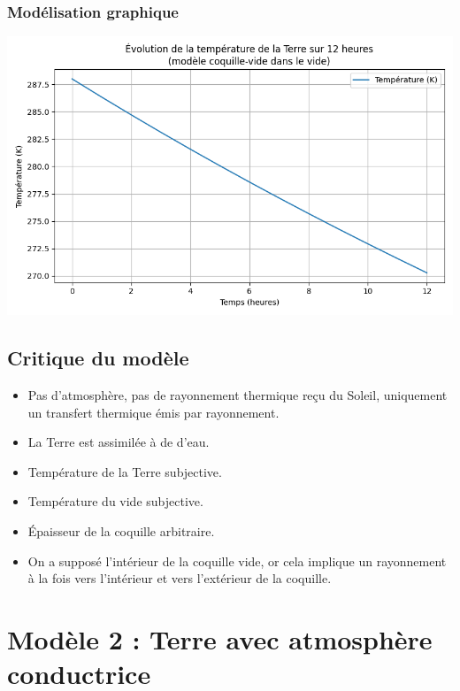 \documentclass[a4paper,12pt]{article}
\begin{document}
\subsubsection*{Modélisation graphique}   
\begin{center}
  \includegraphics[width=0.8\linewidth]{../modele1/figures/modele1_coquille.png} 
\end{center}



\subsection{Critique du modèle}

\begin{itemize}
    \item Pas d’atmosphère, pas de rayonnement thermique reçu du Soleil, uniquement un transfert thermique émis par rayonnement.
    \item La Terre est assimilée à de d’eau.
    \item Température de la Terre subjective.
    \item Température du vide subjective.
    \item Épaisseur de la coquille arbitraire.
    \item On a supposé l'intérieur de la coquille vide, or cela implique un rayonnement à la fois vers l'intérieur et vers l'extérieur de la coquille.
\end{itemize}  

\newpage
\section{Modèle 2 : Terre avec atmosphère conductrice}
\end{document}
